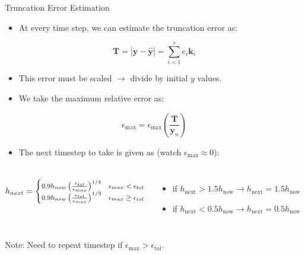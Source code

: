 \documentclass[serif]{beamer}
\begin{document}
\begin{frame}{Truncation Error Estimation}
  \begin{itemize}
    \item At every time step, we can estimate the truncation error as:
  \end{itemize}
  \begin{equation}
    \nonumber
    \mathbf{T} = \left| \mathbf{y} - \hat{\mathbf{y}} \right| = \sum_{i=1}^s e_i \mathbf{k}_i
  \end{equation}
  \vspace{-0.3cm}
  \begin{itemize}
   \item This error must be scaled $\rightarrow$ divide by initial $y$ values.
   \item We take the maximum relative error as:
  \end{itemize}

  \begin{equation}
    \nonumber
    \epsilon_{\mathrm{max}} = \epsilon_\mathrm{\mathrm{max}}\left(\frac{\mathbf{T}}{\mathbf{y}_n}\right)
  \end{equation}\vspace{-0.3cm}
  \begin{itemize}
    \item The next timestep to take is given as (watch $\epsilon_{\mathrm{max}} \approx 0$):
  \end{itemize}
  
  \begin{columns}[T]
  \vspace{-0.5cm}
  \begin{equation}
    \footnotesize
    \nonumber
    h_{next}=\begin{cases}
    0.9h_{now}\left(\frac{\epsilon_{tol}}{\epsilon_{max}}\right)^{1/4} & \epsilon_{max}<\epsilon_{tol}\\
    0.9h_{now}\left(\frac{\epsilon_{tol}}{\epsilon_{max}}\right)^{1/3} & \epsilon_{max}\ge\epsilon_{tol}
    \end{cases}
  \end{equation}
  \vspace{0.1cm}
  \begin{itemize}
   \footnotesize
   \item if $h_{\mathrm{next}} > 1.5 h_{\mathrm{now}} \rightarrow h_{\mathrm{next}} = 1.5h_{\mathrm{now}}$
   \item if $h_{\mathrm{next}} < 0.5 h_{\mathrm{now}} \rightarrow h_{\mathrm{next}} = 0.5h_{\mathrm{now}}$
  \end{itemize}
  \end{columns}
  \vspace{-0.15cm}
  \begin{center}
    \alert{Note:} Need to repeat timestep if $\epsilon_{\mathrm{max}} > \epsilon_{\mathrm{tol}}$.
  \end{center}
\end{frame}
\end{document}
